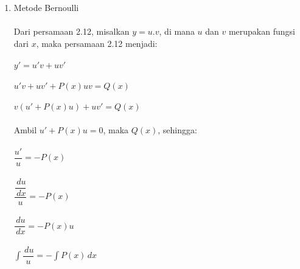 \begin{enumerate}[1.]
	\item Metode Bernoulli \\ \\
	Dari persamaan 2.12, misalkan \begin{math} y = u.v \end{math}, di mana \begin{math} u \end{math} dan \begin{math} v \end{math} merupakan fungsi dari \begin{math} x \end{math}, maka persamaan 2.12 menjadi: \\ \\
	\begin{math} y' = u'v + uv' \end{math} \\ \\
	\begin{math} u'v + uv' + P(x)uv = Q(x) \end{math} \\ \\
	\begin{math}v(u' +P(x)u) + uv' = Q(x) \end{math} \\ \\
	Ambil \begin{math} u' + P(x)u = 0 \end{math}, maka \begin{math} Q(x) \end{math}, sehingga: \\ \\
	\begin{math} \dfrac{u'}{u} = -P(x) \end{math} \\ \\
	\begin{math} \dfrac{\dfrac{\, du}{\, dx}}{u} = -P(x) \end{math} \\ \\
	\begin{math} \dfrac{\, du}{\, dx} = -P(x)u \end{math} \\ \\
	\begin{math} \int \dfrac{\, du}{u} = -\int P(x) \, dx \end{math} \\ \\

\end{enumerate}
